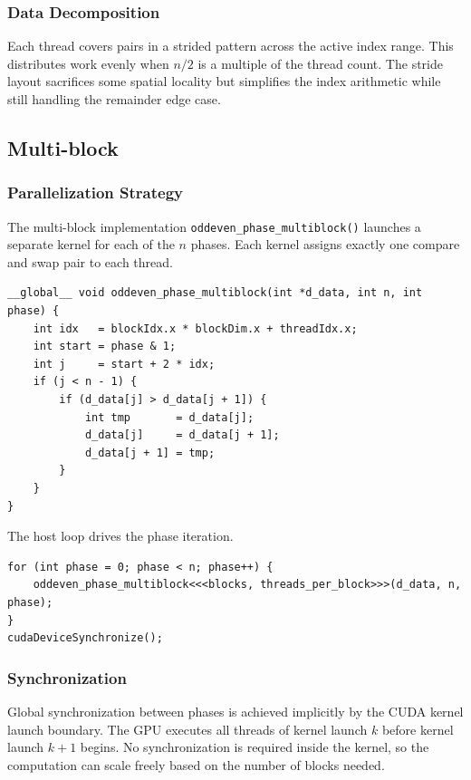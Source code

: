\documentclass[11pt,a4paper]{article}
\begin{document}
\subsubsection{Data Decomposition}

Each thread covers pairs in a strided pattern across the active index range. This distributes work evenly when $n/2$ is a multiple of the thread count. The stride layout sacrifices some spatial locality but simplifies the index arithmetic while still handling the remainder edge case.

\subsection{Multi-block}

\subsubsection{Parallelization Strategy}

The multi-block implementation \texttt{oddeven\_phase\_multiblock()} launches a separate kernel for each of the $n$ phases. Each kernel assigns exactly one compare and swap pair to each thread.

\begin{lstlisting}[caption={Multi-block kernel -- one pair per thread}]
__global__ void oddeven_phase_multiblock(int *d_data, int n, int phase) {
    int idx   = blockIdx.x * blockDim.x + threadIdx.x;
    int start = phase & 1;
    int j     = start + 2 * idx;
    if (j < n - 1) {
        if (d_data[j] > d_data[j + 1]) {
            int tmp       = d_data[j];
            d_data[j]     = d_data[j + 1];
            d_data[j + 1] = tmp;
        }
    }
}
\end{lstlisting}

The host loop drives the phase iteration.

\begin{lstlisting}[caption={Host-side phase loop}]
for (int phase = 0; phase < n; phase++) {
    oddeven_phase_multiblock<<<blocks, threads_per_block>>>(d_data, n, phase);
}
cudaDeviceSynchronize();
\end{lstlisting}

\subsubsection{Synchronization}

Global synchronization between phases is achieved implicitly by the CUDA kernel launch boundary. The GPU executes all threads of kernel launch $k$ before kernel launch $k+1$ begins. No synchronization is required inside the kernel, so the computation can scale freely based on the number of blocks needed.
\end{document}
